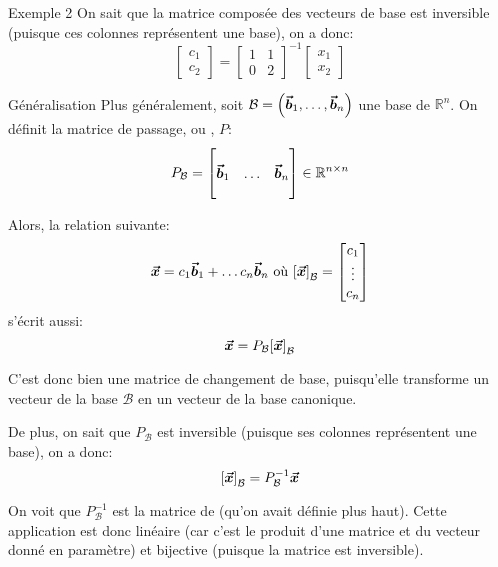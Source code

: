 \documentclass[a4paper]{article}
\begin{document}
\begin{parag}{Exemple 2}
    On sait que la matrice composée des vecteurs de base est inversible (puisque ces colonnes représentent une base), on a donc:
    \[\begin{bmatrix} c_1 \\ c_2 \end{bmatrix} = \begin{bmatrix} 1 & 1 \\ 0 & 2 \end{bmatrix}^{-1} \begin{bmatrix} x_1 \\ x_2 \end{bmatrix} \]

\end{parag}

\begin{parag}{Généralisation}
    Plus généralement, soit $\mathcal{B} = \left(\bvec{b}_1, \ldots, \bvec{b}_n\right)$ une base de $\mathbb{R}^{n}$. On définit la matrice de passage, ou , $P$:
    \[P_{\mathcal{B}} = \begin{bmatrix}  &  &  \\ \bm{\protect\vec{b}}_1 & \ldots & \bm{\protect\vec{b}}_n \\  &  &  \end{bmatrix} \in \mathbb{R}^{n\times n}\]

    Alors, la relation suivante:
    \[\bvec{x} = c_1 \bvec{b}_1 + \ldots c_n \bvec{b}_n \text{ où } \left[\bvec{x}\right]_{\mathcal{B}} = \begin{bmatrix} c_1 \\ \vdots \\ c_n \end{bmatrix}\]
    s'écrit aussi:
    \[\bvec{x} = P_{\mathcal{B}} \left[\bvec{x}\right]_{\mathcal{B}}\]

    C'est donc bien une matrice de changement de base, puisqu'elle transforme un vecteur de la base $\mathcal{B}$ en un vecteur de la base canonique.

    De plus, on sait que $P_{\mathcal{B}}$ est inversible (puisque ses colonnes représentent une base), on a donc:
    \[\left[\bvec{x}\right]_{\mathcal{B}} = P_{\mathcal{B}}^{-1} \bvec{x}\]

    On voit que $P_{\mathcal{B}}^{-1}$ est la matrice de  (qu'on avait définie plus haut). Cette application est donc linéaire (car c'est le produit d'une matrice et du vecteur donné en paramètre) et bijective (puisque la matrice est inversible).

\end{parag}
\end{document}
